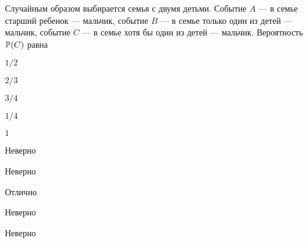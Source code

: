 
\begin{question}
Случайным образом выбирается семья с двумя детьми. Событие \(A\) --- в
семье старший ребенок --- мальчик, событие \(B\) --- в семье только один
из детей --- мальчик, событие \(C\) --- в семье хотя бы один из детей
--- мальчик. Вероятность \(\P(C)\) равна
\begin{answerlist}
  \item \(1/2\)
  \item \(2/3\)
  \item \(3/4\)
  \item \(1/4\)
  \item \(1\)
\end{answerlist}
\end{question}

\begin{solution}
\begin{answerlist}
  \item Неверно
  \item Неверно
  \item Отлично
  \item Неверно
  \item Неверно
\end{answerlist}
\end{solution}

